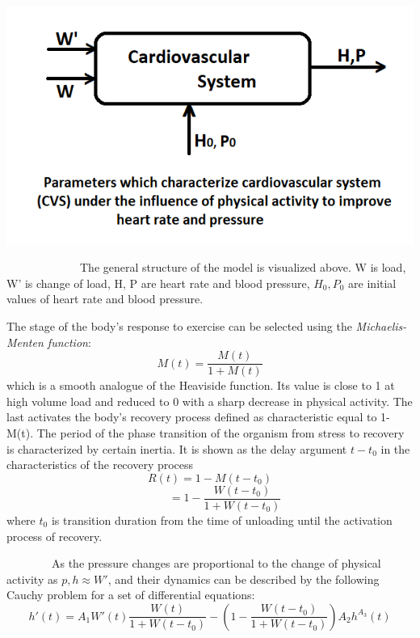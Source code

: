 \begin{center} %
	\scalebox{1.00} %
	{\includegraphics{graph11.png}} %
\end{center}



\par ~~~~~~~~~~~~~The general structure of the model is visualized above. W is load, W' is change of load, H, P are heart rate and blood pressure, $H_{0}, P_{0}$ are initial values of heart rate and blood pressure.
\par The stage of the body’s response to exercise can be selected using the \textit{Michaelis-Menten function}:
$$ M(t)=\frac{M(t)}{1+M(t)}$$
which is a smooth analogue of the Heaviside function. Its value is close to 1 at high volume load and reduced to 0 with a sharp decrease in physical activity. The last activates the body’s recovery process defined as characteristic equal to 1-M(t). The period of the phase transition of the organism from stress to recovery is characterized by certain inertia. It is shown as the delay argument $t-t_{0}$ in the characteristics of the recovery process
$$R(t)=1-M(t-t_{0})$$
$$~~~~~~~~~~~~=1-\frac{W(t-t_{0})}{1+W(t-t_{0})}$$
where $t_{0}$ is transition duration from the time of unloading until the activation process of recovery. 
\par ~~~~~~~~As the pressure changes are proportional to the change of physical activity as $p,h\approx W' $, and their dynamics can be described by the following Cauchy problem for a set of differential equations:
$$h'(t)=A_{1}W'(t) \frac{W(t)}{1+W(t-t_{0})}-(1-\frac{W(t-t_{0})}{1+W(t-t_{0})})A_{2}h^{A_{3}}(t)$$

